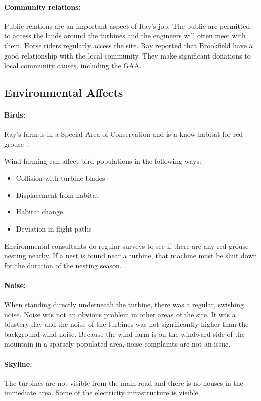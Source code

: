 \documentclass[12pt]{article} %
\newlength{\wideitemsep}
\let\olditem\item
\renewcommand{\item}{\setlength{\itemsep}{\wideitemsep}\olditem}
\begin{document}
\paragraph{Community relations:} Public relations are an important aspect of Ray's job. The public are permitted to access the lands around the turbines and the engineers will often meet with them. Horse riders regularly access the site.
Ray reported that Brookfield have a good relationship with the local community. They make significant donations to local community causes, including the GAA.

\subsection{Environmental Affects}

\paragraph{Birds:} 
Ray's farm is in a Special Area of Conservation and is a know habitat for red grouse \cite{birds}.

Wind farming can affect bird populations in the following ways:
  \begin{itemize}
    \item{Collision with turbine blades}
    \item{Displacement from habitat}
    \item{Habitat change}
    \item{Deviation in flight paths}
  \end{itemize}

Environmental consultants do regular surveys to see if there are any red grouse nesting nearby. If a nest is found near a turbine, that machine must be shut down for the duration of the nesting season.

\paragraph{Noise:} When standing directly underneath the turbine, there was a regular, swishing noise. Noise was not an obvious problem in other areas of the site. It was a blustery day and the noise of the turbines was not significantly higher than the background wind noise.
Because the wind farm is on the windward side of the mountain in a sparsely populated area, noise complaints are not an issue.

\paragraph{Skyline:} The turbines are not visible from the main road and there is no houses in the immediate area. Some of the electricity infrastructure is visible.
\end{document}
